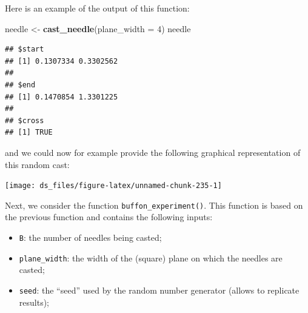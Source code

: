 \documentclass[12pt,]{krantz}
\newenvironment{Shaded}{\begin{snugshade}}{\end{snugshade}}
\newcommand{\KeywordTok}[1]{\textcolor[rgb]{0.27,0.27,0.27}{\textbf{#1}}}
\newcommand{\DataTypeTok}[1]{\textcolor[rgb]{0.27,0.27,0.27}{#1}}
\newcommand{\DecValTok}[1]{\textcolor[rgb]{0.06,0.06,0.06}{#1}}
\newcommand{\StringTok}[1]{\textcolor[rgb]{0.5,0.5,0.5}{#1}}
\newcommand{\OtherTok}[1]{\textcolor[rgb]{0.37,0.37,0.37}{#1}}
\newcommand{\OperatorTok}[1]{\textcolor[rgb]{0.43,0.43,0.43}{\textbf{#1}}}
\newcommand{\NormalTok}[1]{#1}
\providecommand{\tightlist}{%
  \setlength{\itemsep}{0pt}\setlength{\parskip}{0pt}}
\begin{document}
Here is an example of the output of this function:

\begin{Shaded}
\begin{Highlighting}[]
\NormalTok{needle <-}\StringTok{ }\KeywordTok{cast_needle}\NormalTok{(}\DataTypeTok{plane_width =} \DecValTok{4}\NormalTok{)}
\NormalTok{needle}
\end{Highlighting}
\end{Shaded}

\begin{verbatim}
## $start
## [1] 0.1307334 0.3302562
## 
## $end
## [1] 0.1470854 1.3301225
## 
## $cross
## [1] TRUE
\end{verbatim}

and we could now for example provide the following graphical
representation of this random cast:

\begin{Shaded}
\end{Shaded}

\begin{center}\texttt{[image: ds\_files/figure-latex/unnamed-chunk-235-1]} \end{center}

Next, we consider the function \texttt{buffon\_experiment()}. This
function is based on the previous function and contains the following
inputs:

\begin{itemize}
\tightlist
\item
  \texttt{B}: the number of needles being casted;
\item
  \texttt{plane\_width}: the width of the (square) plane on which the
  needles are casted;
\item
  \texttt{seed}: the ``seed'' used by the random number generator
  (allows to replicate results);
\end{itemize}
\end{document}
